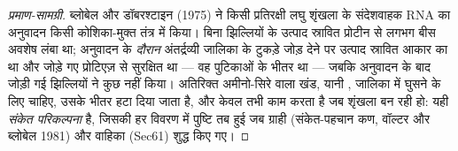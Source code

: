 \begin{proof}[प्रमाण-सामग्री]
ब्लोबेल और डॉबरश्टाइन (1975) ने किसी प्रतिरक्षी लघु शृंखला के संदेशवाहक
RNA का अनुवादन किसी कोशिका-मुक्त तंत्र में किया। बिना झिल्लियों के
उत्पाद स्रावित प्रोटीन से लगभग बीस अवशेष लंबा था;
अनुवादन के \emph{दौरान} अंतर्द्रव्यी जालिका के टुकड़े जोड़ देने पर
उत्पाद स्रावित आकार का था और जोड़े गए प्रोटिएज़ से सुरक्षित था ---
वह पुटिकाओं के भीतर था --- जबकि अनुवादन के बाद जोड़ी गई झिल्लियों ने
कुछ नहीं किया। अतिरिक्त अमीनो-सिरे वाला खंड, यानी ,
जालिका में घुसने के लिए चाहिए, उसके भीतर हटा दिया जाता है, और केवल तभी
काम करता है जब शृंखला बन रही हो: यही \emph{संकेत
परिकल्पना} है, जिसकी हर विवरण में पुष्टि तब हुई जब ग्राही
(संकेत-पहचान कण, वॉल्टर और ब्लोबेल 1981) और वाहिका
(Sec61) शुद्ध किए गए।
\end{proof}

